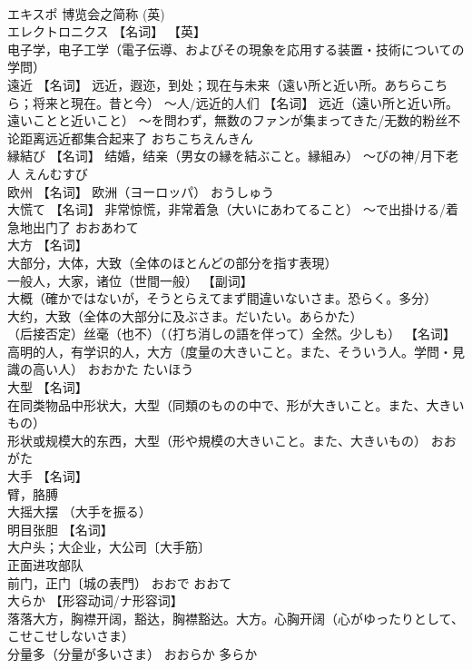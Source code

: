 \documentclass[8pt]{extreport}
\begin{document}
\begin{CJK}{UTF8}{min}
\\	エキスポ	博览会之简称 (英) 
\\	エレクトロニクス	【名词】 【英】
\\	电子学，电子工学（電子伝導、およびその現象を応用する装置・技術についての学問）		
\\	遠近	【名词】 远近，遐迩，到处；现在与未来（遠い所と近い所。あちらこちら；将来と現在。昔と今） ～人/远近的人们 【名词】 远近（遠い所と近い所。遠いことと近いこと） ～を問わず，無数のファンが集まってきた/无数的粉丝不论距离远近都集合起来了	おちこちえんきん	
\\	縁結び	【名词】 结婚，结亲（男女の縁を結ぶこと。縁組み） ～びの神/月下老人	えんむすび	
\\	欧州	【名词】 欧洲（ヨーロッパ）	おうしゅう	
\\	大慌て	【名词】 非常惊慌，非常着急（大いにあわてること） ～で出掛ける/着急地出门了	おおあわて	
\\	大方	【名词】 
\\	大部分，大体，大致（全体のほとんどの部分を指す表現） 
\\	一般人，大家，诸位（世間一般） 【副词】 
\\	大概（確かではないが，そうとらえてまず間違いないさま。恐らく。多分） 
\\	大约，大致（全体の大部分に及ぶさま。だいたい。あらかた） 
\\	（后接否定）丝毫（也不）（（打ち消しの語を伴って）全然。少しも） 【名词】 高明的人，有学识的人，大方（度量の大きいこと。また、そういう人。学問・見識の高い人）	おおかた たいほう	
\\	大型	【名词】 
\\	在同类物品中形状大，大型（同類のものの中で、形が大きいこと。また、大きいもの） 
\\	形状或规模大的东西，大型（形や規模の大きいこと。また、大きいもの）	おおがた	
\\	大手	【名词】 
\\	臂，胳膊 
\\	大摇大摆 （大手を振る） 
\\	明目张胆 【名词】 
\\	大户头；大企业，大公司〔大手筋〕 
\\	正面进攻部队 
\\	前门，正门〔城の表門）	おおで おおて	
\\	大らか	【形容动词/ナ形容词】 
\\	落落大方，胸襟开阔，豁达，胸襟豁达。大方。心胸开阔（心がゆったりとして、こせこせしないさま） 
\\	分量多（分量が多いさま）	おおらか	多らか

\end{CJK}
\end{document}
